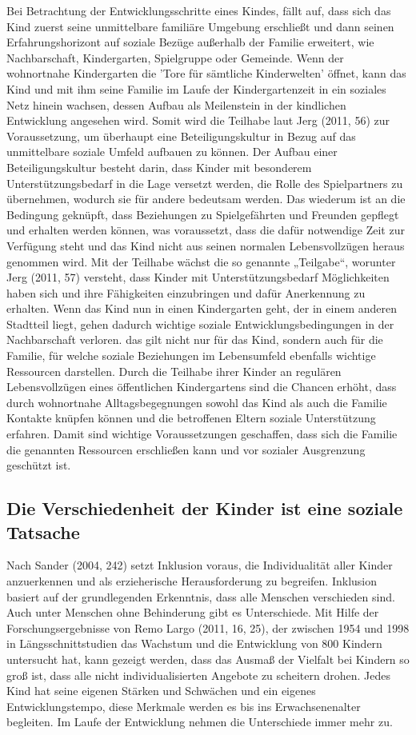 Bei Betrachtung der Entwicklungsschritte eines Kindes, fällt auf, dass sich das Kind zuerst seine unmittelbare familiäre Umgebung erschließt und dann seinen Erfahrungshorizont auf soziale Bezüge außerhalb der Familie erweitert, wie Nachbarschaft, Kindergarten, Spielgruppe oder Gemeinde. Wenn der wohnortnahe Kindergarten die 'Tore für sämtliche Kinderwelten' öffnet, kann das Kind und mit ihm seine Familie im Laufe der Kindergartenzeit in ein soziales Netz hinein wachsen, dessen Aufbau als Meilenstein in der kindlichen Entwicklung angesehen wird. 
Somit wird die Teilhabe laut Jerg (2011, 56) zur Voraussetzung, um überhaupt eine Beteiligungskultur in Bezug auf das unmittelbare soziale Umfeld aufbauen zu können. Der Aufbau einer Beteiligungskultur besteht darin, dass Kinder mit besonderem Unterstützungsbedarf in die Lage versetzt werden, die Rolle des Spielpartners zu übernehmen, wodurch sie für andere bedeutsam werden. Das wiederum ist an die Bedingung geknüpft, dass Beziehungen zu Spielgefährten und Freunden gepflegt und erhalten werden können, was voraussetzt, dass die dafür notwendige Zeit zur Verfügung steht und das Kind nicht aus seinen normalen Lebensvollzügen heraus genommen wird.
Mit der Teilhabe wächst die so genannte „Teilgabe“, worunter Jerg (2011, 57) versteht, dass Kinder mit Unterstützungsbedarf Möglichkeiten haben sich und ihre Fähigkeiten einzubringen und dafür Anerkennung zu erhalten. 
Wenn das Kind nun in einen Kindergarten geht, der in einem anderen Stadtteil liegt, gehen dadurch wichtige soziale Entwicklungsbedingungen in der Nachbarschaft verloren. das gilt nicht nur für das Kind, sondern auch für die Familie, für welche soziale Beziehungen im Lebensumfeld ebenfalls wichtige Ressourcen darstellen. Durch die Teilhabe ihrer Kinder an regulären Lebensvollzügen eines öffentlichen Kindergartens sind die Chancen erhöht, dass durch wohnortnahe Alltagsbegegnungen sowohl das Kind als auch die Familie Kontakte knüpfen können und die betroffenen Eltern soziale Unterstützung erfahren. Damit sind wichtige Voraussetzungen geschaffen, dass sich die Familie die genannten Ressourcen erschließen kann und vor sozialer Ausgrenzung geschützt ist. 

\subsection{Die Verschiedenheit der Kinder ist eine soziale Tatsache}\label{sec:heterogenität}
Nach Sander (2004, 242) setzt Inklusion voraus, die Individualität aller Kinder anzuerkennen und als erzieherische Herausforderung zu begreifen. Inklusion basiert auf der grundlegenden Erkenntnis, dass alle Menschen verschieden sind. Auch unter Menschen ohne Behinderung gibt es Unterschiede. Mit Hilfe der Forschungsergebnisse von Remo Largo (2011, 16, 25), der zwischen 1954 und 1998 in Längsschnittstudien das Wachstum und die Entwicklung von 800 Kindern untersucht hat, kann gezeigt werden, dass das Ausmaß der Vielfalt bei Kindern so groß ist, dass alle nicht individualisierten Angebote zu scheitern drohen. Jedes Kind hat seine eigenen Stärken und Schwächen und ein eigenes Entwicklungstempo, diese Merkmale werden es bis ins Erwachsenenalter begleiten. Im Laufe der Entwicklung nehmen die Unterschiede immer mehr zu. 

